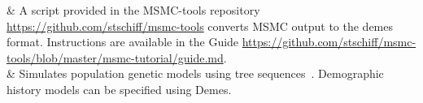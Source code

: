 \MSMC & A script provided in the MSMC-tools repository \url{https://github.com/stschiff/msmc-tools}
    converts MSMC \citep{SchiffelsDurbin2014,WangSchiffels2020} output to the demes format. Instructions are available in the Guide \url{https://github.com/stschiff/msmc-tools/blob/master/msmc-tutorial/guide.md}.\\

\msprime &
    Simulates population genetic models using tree sequences~\citep{kelleher2016efficient,kelleher2020coalescent,baumdicker2021-iu}. Demographic history models can be specified using Demes.\\

\bottomrule   
